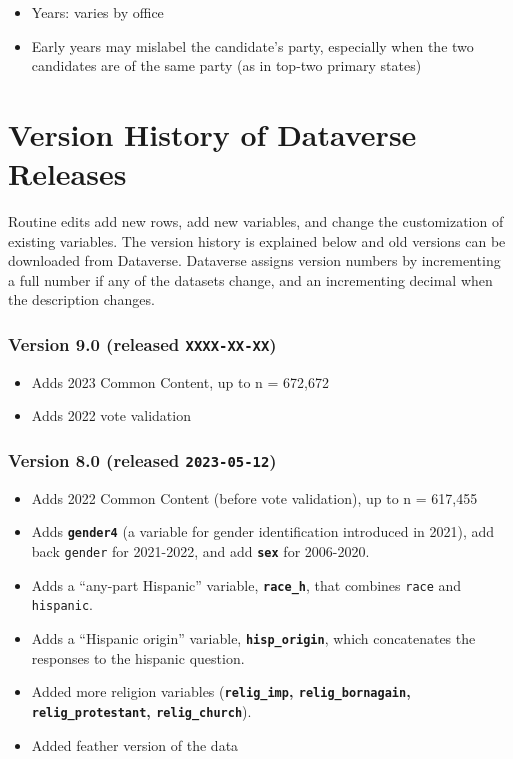 \documentclass[10pt,article,oneside]{memoir}
\theoremstyle{definition}
\begin{document}
\begin{itemize}
\tightlist
\item
  Years: varies by office
\item
  Early years may mislabel the candidate's party, especially when the
  two candidates are of the same party (as in top-two primary states)
\end{itemize}

\newpage

\section{Version History of Dataverse
Releases}\label{version-history-of-dataverse-releases}

Routine edits add new rows, add new variables, and change the
customization of existing variables. The version history is explained
below and old versions can be downloaded from Dataverse. Dataverse
assigns version numbers by incrementing a full number if any of the
datasets change, and an incrementing decimal when the description
changes.

\subsubsection{\texorpdfstring{Version 9.0 (released
\texttt{XXXX-XX-XX})}{Version 9.0 (released XXXX-XX-XX)}}\label{version-9.0-released-xxxx-xx-xx}

\begin{itemize}
\tightlist
\item
  Adds 2023 Common Content, up to n = 672,672
\item
  Adds 2022 vote validation
\end{itemize}

\subsubsection{\texorpdfstring{Version 8.0 (released
\texttt{2023-05-12})}{Version 8.0 (released 2023-05-12)}}\label{version-8.0-released-2023-05-12}

\begin{itemize}
\tightlist
\item
  Adds 2022 Common Content (before vote validation), up to n = 617,455
\item
  Adds \textbf{\texttt{gender4}} (a variable for gender identification
  introduced in 2021), add back \texttt{gender} for 2021-2022, and add
  \textbf{\texttt{sex}} for 2006-2020.
\item
  Adds a ``any-part Hispanic'' variable, \textbf{\texttt{race\_h}}, that
  combines \texttt{race} and \texttt{hispanic}.
\item
  Adds a ``Hispanic origin'' variable, \textbf{\texttt{hisp\_origin}},
  which concatenates the responses to the hispanic question.
\item
  Added more religion variables (\textbf{\texttt{relig\_imp},
  \texttt{relig\_bornagain}, \texttt{relig\_protestant},
  \texttt{relig\_church}}).
\item
  Added feather version of the data
\end{itemize}
\end{document}
